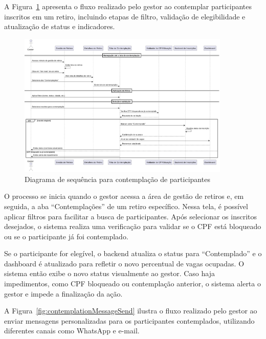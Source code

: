 A Figura~\ref{fig:participantContemplation} apresenta o fluxo realizado pelo gestor ao contemplar participantes inscritos em um retiro, incluindo etapas de filtro, validação de elegibilidade e atualização de status e indicadores.

\begin{figure}[H]
    \centering
    \includegraphics[width=0.9\textwidth]{images/diagramasdesequencias/participantContemplation.png}
    \caption{Diagrama de sequência para contemplação de participantes}
    \label{fig:participantContemplation}
\end{figure}

O processo se inicia quando o gestor acessa a área de gestão de retiros e, em seguida, a aba “Contemplações” de um retiro específico. Nessa tela, é possível aplicar filtros para facilitar a busca de participantes. Após selecionar os inscritos desejados, o sistema realiza uma verificação para validar se o CPF está bloqueado ou se o participante já foi contemplado.

Se o participante for elegível, o backend atualiza o status para “Contemplado” e o dashboard é atualizado para refletir o novo percentual de vagas ocupadas. O sistema então exibe o novo status visualmente ao gestor. Caso haja impedimentos, como CPF bloqueado ou contemplação anterior, o sistema alerta o gestor e impede a finalização da ação.


A Figura~\ref{fig:contemplationMessageSend} ilustra o fluxo realizado pelo gestor ao enviar mensagens personalizadas para os participantes contemplados, utilizando diferentes canais como WhatsApp e e-mail.

